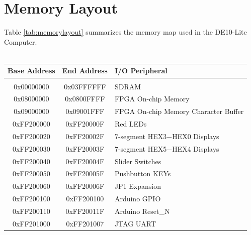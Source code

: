 \documentclass[11pt, twoside, pdftex]{article}
\newcommand{\commonFiles}{../../../common/doc}
\begin{document}
\clearpage


\section{Memory Layout}

\noindent
Table \ref{tab:memorylayout} summarizes the memory map used in the DE10-Lite Computer.
~\\
~\\

\begin{table}[h]
    \begin{center}
    \begin{tabular}{c|c|l}
            \textbf{Base Address}
            & \textbf{End Address}
            & \textbf{I/O Peripheral}
				\\\hline\vspace{-3mm}\\
            0x00000000
            & 0x03FFFFFF
            & SDRAM
        \\
            0x08000000
            & 0x0800FFFF
            & FPGA On-chip Memory
        \\
            0x09000000
            & 0x09001FFF
            & FPGA On-chip Memory Character Buffer
        \\
            0xFF200000
            & 0xFF20000F
            & Red LEDs
        \\
            0xFF200020
            & 0xFF20002F
            & 7-segment HEX3$-$HEX0 Displays
        \\
            0xFF200030
            & 0xFF20003F
            & 7-segment HEX5$-$HEX4 Displays
        \\
            0xFF200040
            & 0xFF20004F
            & Slider Switches
        \\
            0xFF200050
            & 0xFF20005F
            & Pushbutton KEYs
        \\
            0xFF200060
            & 0xFF20006F
            & JP1 Expansion
        \\
        	0xFF200100
        	& 0xFF200100
        	& Arduino GPIO
        \\
        	0xFF200110
        	& 0xFF20011F
        	& Arduino Reset\_N
        \\
            0xFF201000
            & 0xFF201007
            & JTAG UART
        \\

\end{tabular}
\end{center}
\end{table}
\end{document}

